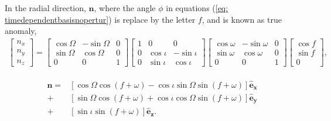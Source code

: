 In the radial direction, $\mathbf{n}$, where the angle $\phi$ in equations (\ref{eq: timedependentbasisnopertur}) is replace by the letter $f$, and is known as true anomaly,
\begin{align*}
\begin{bmatrix}
n_x\\
n_y\\
n_z\end{bmatrix}
= 
\begin{bmatrix}
\cos \Omega & -\sin \Omega & 0 \\
\sin \Omega & \cos\Omega & 0\\
0&0&1
\end{bmatrix}
\begin{bmatrix}
1&0&0\\
0&\cos \iota & -\sin \iota \\
0& \sin \iota & \cos\iota 
\end{bmatrix}
\begin{bmatrix}
\cos \omega & -\sin {\omega} & 0 \\
\sin \omega & \cos\omega & 0\\
0&0&1
\end{bmatrix}
\begin{bmatrix}
\cos f\\
\sin f\\
0\end{bmatrix},
\end{align*}

\begin{align}
\begin{split}
	\mathbf{n} =& [\cos \Omega \cos (f +\omega) - \cos \iota \sin \Omega \sin (f+\omega)] \mathbf{\hat{e}_x}\\
	+& [\sin \Omega \cos (f +\omega) + \cos \iota \cos \Omega \sin (f+\omega)] \mathbf{\hat{e}_y}\\
	+ & [ \sin \iota  \sin (f+\omega)] \mathbf{\hat{e}_z}.
	\end{split}
\label{eq: nunitary}
\end{align}

